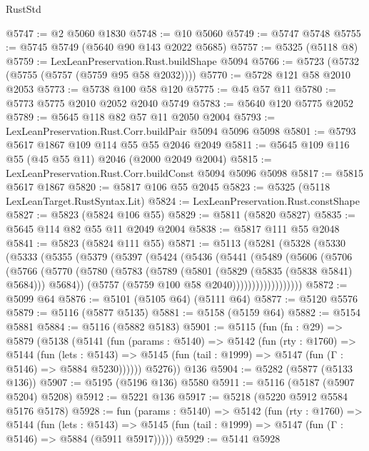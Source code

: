 \begin{lexlean}{RustStd}
\begin{coremodule}
@5747 := @2 @5060 @1830
@5748 := @10 @5060
@5749 := @5747 @5748
@5755 := @5745 @5749 (@5640 @90 @143 @2022 @5685)
@5757 := @5325 (@5118 @8)
@5759 := LexLeanPreservation.Rust.buildShape @5094
@5766 := @5723 (@5732 (@5755 (@5757 (@5759 @95 @58 @2032))))
@5770 := @5728 @121 @58 @2010 @2053
@5773 := @5738 @100 @58 @120
@5775 := @45 @57 @11
@5780 := @5773 @5775 @2010 @2052 @2040 @5749
@5783 := @5640 @120 @5775 @2052
@5789 := @5645 @118 @82 @57 @11 @2050 @2004
@5793 := LexLeanPreservation.Rust.Corr.buildPair @5094 @5096 @5098
@5801 := @5793 @5617 @1867 @109 @114 @55 @55 @2046 @2049
@5811 := @5645 @109 @116 @55 (@45 @55 @11) @2046 (@2000 @2049 @2004)
@5815 := LexLeanPreservation.Rust.Corr.buildConst @5094 @5096 @5098
@5817 := @5815 @5617 @1867
@5820 := @5817 @106 @55 @2045
@5823 := @5325 (@5118 LexLeanTarget.RustSyntax.Lit)
@5824 := LexLeanPreservation.Rust.constShape
@5827 := @5823 (@5824 @106 @55)
@5829 := @5811 (@5820 @5827)
@5835 := @5645 @114 @82 @55 @11 @2049 @2004
@5838 := @5817 @111 @55 @2048
@5841 := @5823 (@5824 @111 @55)
@5871 := @5113
    (@5281
      (@5328
        (@5330
          (@5333
            (@5355
              (@5379
                (@5397
                  (@5424
                    (@5436
                      (@5441
                        (@5489
                          (@5606
                            (@5706
                              (@5766
                                (@5770
                                  (@5780
                                    (@5783
                                      (@5789 (@5801 (@5829 (@5835 (@5838 @5841) @5684))) @5684))
                                    (@5757 (@5759 @100 @58 @2040))))))))))))))))))
@5872 := @5099 @64
@5876 := @5101 (@5105 @64) (@5111 @64)
@5877 := @5120 @5576
@5879 := @5116 (@5877 @5135)
@5881 := @5158 (@5159 @64)
@5882 := @5154 @5881
@5884 := @5116 (@5882 @5183)
@5901 := @5115
    (fun (fn : @29) =>
    @5879
      (@5138
        (@5141
          (fun (params : @5140) =>
          @5142
            (fun (rty : @1760) =>
            @5144
              (fun (lets : @5143) =>
              @5145 (fun (tail : @1999) => @5147 (fun (Γ : @5146) => @5884 @5230))))))
        @5276))
    @136
@5904 := @5282 (@5877 (@5133 @136))
@5907 := @5195 (@5196 @136) @5580
@5911 := @5116 (@5187 (@5907 @5204) @5208)
@5912 := @5221 @136
@5917 := @5218 (@5220 @5912 @5584 @5176 @5178)
@5928 := fun (params : @5140) =>
  @5142
    (fun (rty : @1760) =>
    @5144
      (fun (lets : @5143) =>
      @5145 (fun (tail : @1999) => @5147 (fun (Γ : @5146) => @5884 (@5911 @5917)))))
@5929 := @5141 @5928

\end{coremodule}
\end{lexlean}
